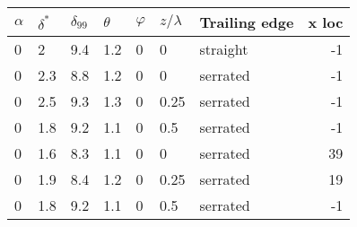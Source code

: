 \begin{tabular}{lllllllr}
\toprule
$\alpha$ & $\delta^*$ & $\delta_{99}$ & $\theta$ & $\varphi$ & $z/\lambda$ & Trailing edge &  x loc \\
\midrule
       0 &          2 &           9.4 &      1.2 &         0 &           0 &      straight &     -1 \\
       0 &        2.3 &           8.8 &      1.2 &         0 &           0 &      serrated &     -1 \\
       0 &        2.5 &           9.3 &      1.3 &         0 &        0.25 &      serrated &     -1 \\
       0 &        1.8 &           9.2 &      1.1 &         0 &         0.5 &      serrated &     -1 \\
       0 &        1.6 &           8.3 &      1.1 &         0 &           0 &      serrated &     39 \\
       0 &        1.9 &           8.4 &      1.2 &         0 &        0.25 &      serrated &     19 \\
       0 &        1.8 &           9.2 &      1.1 &         0 &         0.5 &      serrated &     -1 \\
\bottomrule
\end{tabular}
